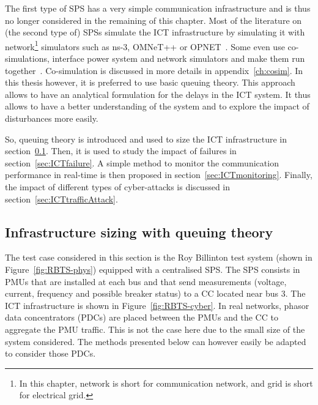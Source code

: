 The first type of SPS has a very simple communication infrastructure and is thus no longer considered in the remaining of this chapter. Most of the literature on (the second type of) SPSs simulate the ICT infrastructure by simulating it with network\footnote{In this chapter, network is short for communication network, and grid is short for electrical grid.} simulators such as ns-3, OMNeT++ or OPNET~\cite{SPS-Ciapessoni}. Some even use co-simulations, \ie interface power system and network simulators and make them run together~\cite{SPS-MingNi, GECOtestcase}. Co-simulation is discussed in more details in appendix~\ref{ch:cosim}. In this thesis however, it is preferred to use basic queuing theory. This approach allows to have an analytical formulation for the delays in the ICT system. It thus allows to have a better understanding of the system and to explore the impact of disturbances more easily.

So, queuing theory is introduced and used to size the ICT infrastructure in section~\ref{sec:ICTsizing}. Then, it is used to study the impact of failures in section~\ref{sec:ICTfailure}. A simple method to monitor the communication performance in real-time is then proposed in section~\ref{sec:ICTmonitoring}. Finally, the impact of different types of cyber-attacks is discussed in section~\ref{sec:ICTtrafficAttack}.


\subsection{Infrastructure sizing with queuing theory}
\label{sec:ICTsizing}

The test case considered in this section is the Roy Billinton test system (shown in Figure~\ref{fig:RBTS-phys}) equipped with a centralised SPS. The SPS consists in PMUs that are installed at each bus and that send measurements (voltage, current, frequency and possible breaker status) to a CC located near bus 3. The ICT infrastructure is shown in Figure~\ref{fig:RBTS-cyber}. In real networks, phasor data concentrators (PDCs) are placed between the PMUs and the CC to aggregate the PMU traffic. This is not the case here due to the small size of the system considered. The methods presented below can however easily be adapted to consider those PDCs.

